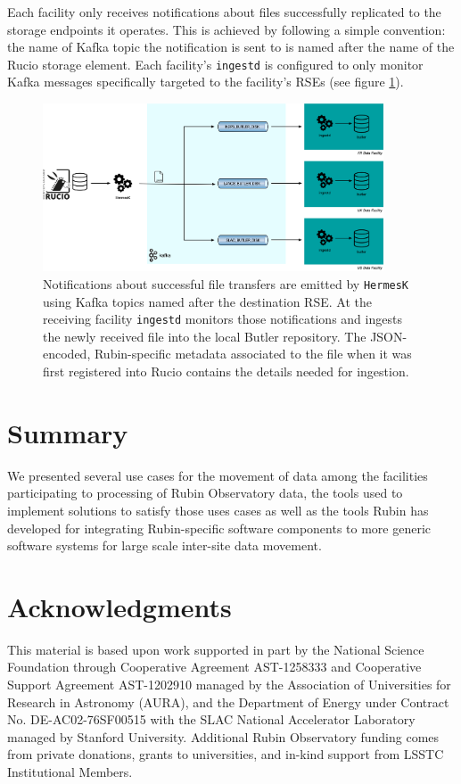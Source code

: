 \documentclass{webofc}
\begin{document}
Each facility only receives notifications about files successfully replicated to the storage endpoints it operates. This is achieved by following a simple convention: the name of Kafka topic the notification is sent to is named after the name of the Rucio storage element. Each facility's \texttt{ingestd} is configured to only monitor Kafka messages specifically targeted to the facility's RSEs (see figure \ref{fig:kafka-control-plane}).

\begin{figure}[h]
\includegraphics[width=0.9\textwidth, center]{images/HermesAndIngestd.png}
\caption{Notifications about successful file transfers are emitted by \texttt{HermesK} using Kafka topics named after the destination RSE. At the receiving facility \texttt{ingestd} monitors those notifications and ingests the newly received file into the local Butler repository. The JSON-encoded, Rubin-specific metadata associated to the file when it was first registered into Rucio contains the details needed for ingestion.}
\label{fig:kafka-control-plane}
\end{figure}


\section{Summary}
\label{summary}
We presented several use cases for the movement of data among the facilities participating to processing of Rubin Observatory data, the tools used to implement solutions to satisfy those uses cases as well as the tools Rubin has developed for integrating Rubin-specific software components to more generic software systems for large scale inter-site data movement.

\section{Acknowledgments}

This material is based upon work supported in part by the National Science Foundation through Cooperative Agreement AST-1258333 and Cooperative Support Agreement AST-1202910 managed by the Association of Universities for Research in Astronomy (AURA), and the Department of Energy under Contract No. DE-AC02-76SF00515 with the SLAC National Accelerator Laboratory managed by Stanford University. Additional Rubin Observatory funding comes from private donations, grants to universities, and in-kind support from LSSTC Institutional Members.


\end{document}
